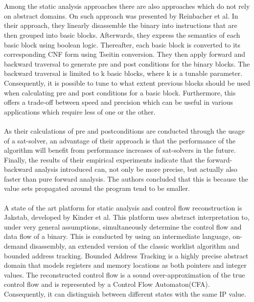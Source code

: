 \documentclass{kththesis}
\begin{document}
\\ \\ 
Among the static analysis approaches there are also approaches which do not rely on abstract domains. On such approach was presented by Reinbacher et al. In their approach, they linearly disassemble the binary into instructions that are then grouped into basic blocks. Afterwards, they express the semantics of each basic block using boolean logic. Thereafter, each basic block is converted to its corresponding CNF form using Tseitin conversion. They then apply forward and backward traversal to generate pre and post conditions for the binary blocks. The backward traversal is limited to k basic blocks, where k is a tunable parameter. Consequently, it is possible to tune to what extent previous blocks should be used when calculating pre and post conditions for a basic block. Furthermore, this offers a trade-off between speed and precision which can be useful in various applications which require less of one or the other.
\\ \\
As their calculations of pre and postconditions are conducted through the usage of a sat-solver, an advantage of their approach is that the performance of the algorithm will benefit from performance increases of sat-solvers in the future. Finally, the results of their empirical experiments indicate that the forward-backward analysis introduced can, not only be more precise, but actually also faster than pure forward analysis. The authors concluded that this is because the value sets propagated around the program tend to be smaller.
\\ \\
A state of the art platform for static analysis and control flow reconstruction is Jakstab\cite{JakstabGit}, developed by Kinder et al\cite{Jakstab}. This platform uses abstract interpretation to, under very general assumptions, simultaneously determine the control flow and data flow of a binary. This is conducted by using an intermediate language, on-demand disassembly, an extended version of the classic worklist algorithm and bounded address tracking. Bounded Address Tracking is a highly precise abstract domain that models registers and memory locations as both pointers and integer values. The reconstructed control flow is a sound over-approximation of the true control flow and is represented by a Control Flow Automaton(CFA). Consequently, it can distinguish between different states with the same IP value.
\\ \\
\end{document}
